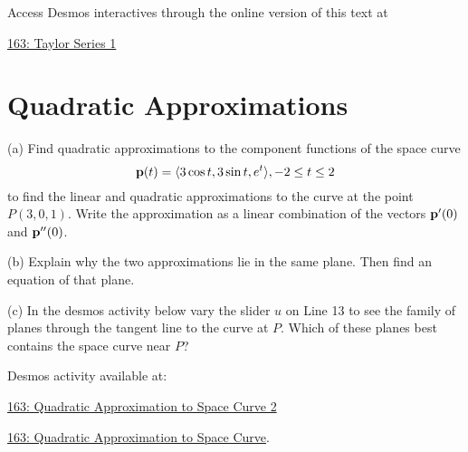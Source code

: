 \documentclass{ximera}
\begin{document}
\begin{exploration}
 
\begin{onlineOnly}
    \begin{center}
\end{center}
\end{onlineOnly}

Access Desmos interactives through the online version of this text at
 
\href{https://www.desmos.com/calculator/ueb0dgixdq}{163: Taylor Series 1}
\end{exploration}







\section{Quadratic Approximations}


\begin{question}  \label{Qgtyhtsry}
(a) Find quadratic approximations to the component functions of the space curve
\[
   {\bf p}(t) = \langle  3 \cos t, 3\sin t, e^t \rangle , -2\leq t \leq 2
\]
to find the linear and quadratic approximations to the curve at the point $P(3,0,1)$. Write the approximation as a linear combination of the vectors ${\bf p}^\prime(0)$ and ${\bf p}^{\prime\prime}(0)$.

(b) Explain why the two approximations lie in the same plane. Then find an equation of that plane.

(c) In the desmos activity below vary the slider $u$ on Line 13 to see the family of planes through the tangent line to the curve at $P$. Which of these planes best contains the space curve near $P$?

Desmos activity available at:

\href{https://www.desmos.com/3d/196e85fe1a}{163: Quadratic Approximation to Space Curve 2}


\href{https://www.desmos.com/3d/a263cd2883}{163: Quadratic Approximation to Space Curve}.

 

\end{question}
\end{document}
